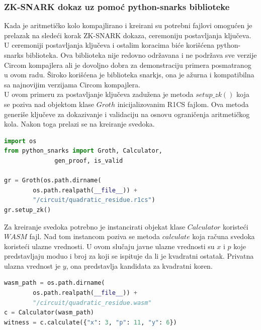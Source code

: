 \subsubsection{\textenglish{ZK-SNARK} dokaz uz pomoć \textenglish{python-snarks} biblioteke}
Kada je aritmetičko kolo kompajlirano i  kreirani su potrebni fajlovi omogućen je prelazak na sledeći korak \textenglish{ZK-SNARK} dokaza, ceremoniju postavljanja ključeva.\\
 U ceremoniji postavljanja ključeva i ostalim koracima biće korišćena \textenglish{python-snarks} biblioteka. Ova biblioteka nije redovno održavana i ne podržava sve verzije \textenglish{Circom} kompajlera ali je dovoljno dobra za demonstraciju primera posmatranog u ovom radu. Široko korišćena je biblioteka \textenglish{snarkjs}, ona je ažurna i kompatibilna sa najnovijim verzijama \textenglish{Circom} kompajlera.\\ U ovom primeru za postavljanje ključeva zadužena je metoda $setup\_zk()$ koja se poziva nad objektom klase $Groth$ inicijalizovanim \textenglish{R1CS} fajlom. Ova metoda generiše ključeve za dokazivanje i validaciju na osnovu ograničenja aritmetičkog kola. Nakon toga prelazi se na kreiranje svedoka.
\begin{english}
\begin{lstlisting}[language=Python]
import os
from python_snarks import Groth, Calculator,
			  gen_proof, is_valid
 		
gr = Groth(os.path.dirname(
		os.path.realpath(__file__)) +
 		"/circuit/quadratic_residue.r1cs")
gr.setup_zk()
\end{lstlisting}
\end{english}
 Za kreiranje svedoka potrebno je instancirati objekat klase $Calculator$ koristeći $WASM$ fajl. Nad tom instancom poziva se metoda $calculate$ koja računa svedoka koristeći ulazne vrednosti. U ovom slučaju javne ulazne vrednosti su $x$ i $p$ koje predstavljaju moduo i broj za koji se ispituje da li je kvadratni ostatak. Privatna ulazna vrednost je $y$, ona predstavlja kandidata za kvadratni koren. 
 
\begin{english}
\begin{lstlisting}[language=Python]
wasm_path = os.path.dirname(
		os.path.realpath(__file__)) +
 		"/circuit/quadratic_residue.wasm"
c = Calculator(wasm_path)
witness = c.calculate({"x": 3, "p": 11, "y": 6})
\end{lstlisting}
\end{english}

